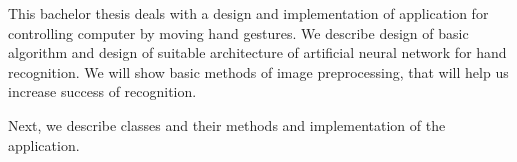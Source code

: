 This bachelor thesis deals with a design and implementation of application for controlling computer by moving hand gestures. We describe design of basic algorithm and design of suitable architecture of artificial neural network for hand recognition. We will show basic methods of image preprocessing, that will help us increase success of recognition.

Next, we describe classes and their methods and implementation of the application.